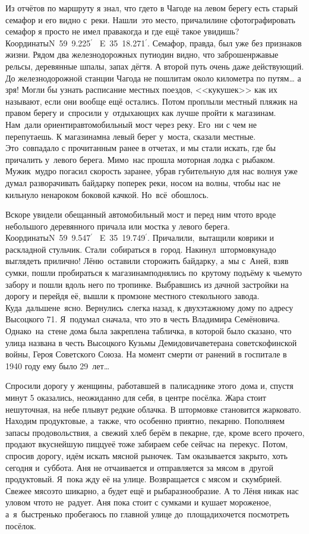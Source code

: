 Из отчётов по маршруту я знал, что где\sdash то в Чагоде на левом берегу есть старый семафор и его видно с~реки. Нашли~это место, причалили\mdash не сфотографировать семафор я просто не имел права\mdash когда и где ещё такое увидишь? Координаты\mdash N~59\degree~9.225$^\prime$~ E~35\degree~18.271$^\prime$. Семафор, правда, был уже без признаков жизни. Рядом два железнодорожных пути\mdash один видно, что заброшен\mdash ржавые рельсы, деревянные шпалы, запах дёгтя. А второй путь очень даже действующий. До железнодорожной станции Чагода не пошли\mdash там около километра по путям… а зря! Могли бы узнать расписание местных поездов, <<кукушек>> как их называют, если они вообще ещё остались. 
\newpage
Потом проплыли местный пляжик на правом берегу и~спросили у~отдыхающих как лучше пройти к магазинам. Нам~дали ориентир\mdash автомобильный мост через реку. Его~ни с чем не перепутаешь. К магазинам\mdash на левый берег у~моста, сказали местные. Это~совпадало с прочитанным ранее в отчетах, и мы стали искать, где бы причалить у~левого берега. Мимо~нас прошла моторная лодка с рыбаком. Мужик~мудро погасил скорость заранее, убрав губительную для нас волну\mdash я уже думал разворачивать байдарку поперек реки, носом на волны, чтобы нас не кильнуло ненароком боковой качкой. Но~всё~обошлось. 

Вскоре увидели обещанный автомобильный мост и перед ним что\sdash то вроде небольшого деревянного причала или мостка у левого берега. Координаты\mdash N~59\degree~9.547$^\prime$~ E~35\degree~19.749$^\prime$. Причалили,~вытащили коврики и раскладной стульчик. Стали~собираться в~город. Накинул~штормовку\mdash надо выглядеть прилично! Лёню~оставили сторожить байдарку, а~мы с~Аней, взяв сумки, пошли пробираться к магазинам\mdash поднялись по~крутому подъёму к чьему\sdash то забору и пошли вдоль него по тропинке. Выбравшись из дачной застройки на дорогу и перейдя её, вышли к промзоне местного стекольного завода. Куда~дальше\mdash не~ясно. Вернулись~слегка назад, к двухэтажному дому по адресу Высоцкого 71. Я~подумал сначала, что это в честь Владимира Семёновича. Однако~на~стене дома была закреплена табличка, в которой было сказано, что улица названа в честь Высоцкого Кузьмы Демидовича\mdash ветерана советско\sdash финской войны, Героя Советского Союза. На момент смерти от ранений в госпитале в 1940 году ему было 29~лет\ldots 

Спросили дорогу у женщины, работавшей в~палисаднике этого~дома и, спустя минут 5 оказались, неожиданно для себя, в центре посёлка. Жара стоит нешуточная, на небе плывут редкие облачка. В штормовке становится жарковато. Находим продуктовые, а~также, что особенно приятно, пекарню. Пополняем запасы продовольствия, а~свежий хлеб берём в пекарне, где, кроме всего прочего, продают вкуснейшую пиццу\mdash её тоже забираем себе сейчас на~перекус. Потом, спросив дорогу, идём искать мясной рыночек. Там оказывается закрыто, хоть сегодня и~суббота. Аня не отчаивается и отправляется за мясом в~другой продуктовый. Я~пока жду её на улице. Возвращается с мясом и~скумбрией. Свежее мясо\mdash это шикарно, а будет ещё и рыба\mdash разнообразие. А то Лёня никак нас уловом что\sdash то не~радует. Аня пока стоит с сумками и кушает мороженое, а~я~быстренько пробегаюсь по главной улице до~площади\mdash хочется посмотреть посёлок.

